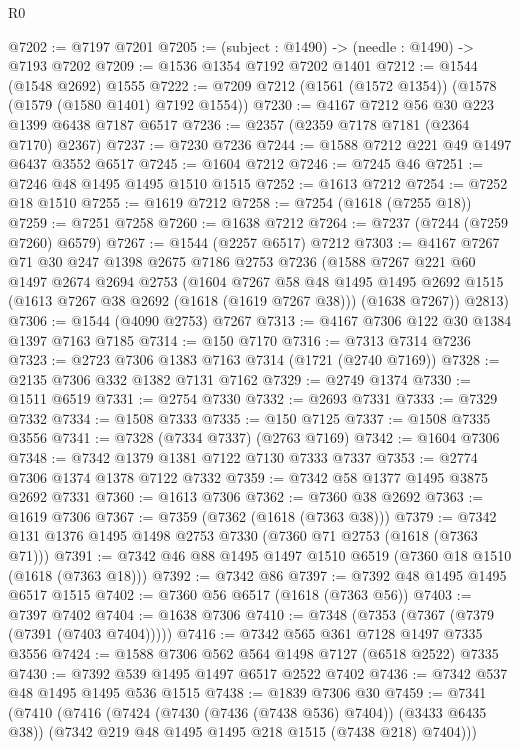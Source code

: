 \begin{lexlean}{R0}
\begin{coremodule}
@7202 := @7197 @7201
@7205 := (subject : @1490) -> (needle : @1490) -> @7193 @7202
@7209 := @1536 @1354 @7192 @7202 @1401
@7212 := @1544 (@1548 @2692) @1555
@7222 := @7209 @7212 (@1561 (@1572 @1354)) (@1578 (@1579 (@1580 @1401) @7192 @1554))
@7230 := @4167 @7212 @56 @30 @223 @1399 @6438 @7187 @6517
@7236 := @2357 (@2359 @7178 @7181 (@2364 @7170) @2367)
@7237 := @7230 @7236
@7244 := @1588 @7212 @221 @49 @1497 @6437 @3552 @6517
@7245 := @1604 @7212
@7246 := @7245 @46
@7251 := @7246 @48 @1495 @1495 @1510 @1515
@7252 := @1613 @7212
@7254 := @7252 @18 @1510
@7255 := @1619 @7212
@7258 := @7254 (@1618 (@7255 @18))
@7259 := @7251 @7258
@7260 := @1638 @7212
@7264 := @7237 (@7244 (@7259 @7260) @6579)
@7267 := @1544 (@2257 @6517) @7212
@7303 := @4167
    @7267
    @71
    @30
    @247
    @1398
    @2675
    @7186
    @2753
    @7236
    (@1588
      @7267
      @221
      @60
      @1497
      @2674
      @2694
      @2753
      (@1604
        @7267
        @58
        @48
        @1495
        @1495
        @2692
        @1515
        (@1613 @7267 @38 @2692 (@1618 (@1619 @7267 @38)))
        (@1638 @7267))
      @2813)
@7306 := @1544 (@4090 @2753) @7267
@7313 := @4167 @7306 @122 @30 @1384 @1397 @7163 @7185
@7314 := @150 @7170
@7316 := @7313 @7314 @7236
@7323 := @2723 @7306 @1383 @7163 @7314 (@1721 (@2740 @7169))
@7328 := @2135 @7306 @332 @1382 @7131 @7162
@7329 := @2749 @1374
@7330 := @1511 @6519
@7331 := @2754 @7330
@7332 := @2693 @7331
@7333 := @7329 @7332
@7334 := @1508 @7333
@7335 := @150 @7125
@7337 := @1508 @7335 @3556
@7341 := @7328 (@7334 @7337) (@2763 @7169)
@7342 := @1604 @7306
@7348 := @7342 @1379 @1381 @7122 @7130 @7333 @7337
@7353 := @2774 @7306 @1374 @1378 @7122 @7332
@7359 := @7342 @58 @1377 @1495 @3875 @2692 @7331
@7360 := @1613 @7306
@7362 := @7360 @38 @2692
@7363 := @1619 @7306
@7367 := @7359 (@7362 (@1618 (@7363 @38)))
@7379 := @7342 @131 @1376 @1495 @1498 @2753 @7330 (@7360 @71 @2753 (@1618 (@7363 @71)))
@7391 := @7342 @46 @88 @1495 @1497 @1510 @6519 (@7360 @18 @1510 (@1618 (@7363 @18)))
@7392 := @7342 @86
@7397 := @7392 @48 @1495 @1495 @6517 @1515
@7402 := @7360 @56 @6517 (@1618 (@7363 @56))
@7403 := @7397 @7402
@7404 := @1638 @7306
@7410 := @7348 (@7353 (@7367 (@7379 (@7391 (@7403 @7404)))))
@7416 := @7342 @565 @361 @7128 @1497 @7335 @3556
@7424 := @1588 @7306 @562 @564 @1498 @7127 (@6518 @2522) @7335
@7430 := @7392 @539 @1495 @1497 @6517 @2522 @7402
@7436 := @7342 @537 @48 @1495 @1495 @536 @1515
@7438 := @1839 @7306 @30
@7459 := @7341
    (@7410
      (@7416
        (@7424 (@7430 (@7436 (@7438 @536) @7404)) (@3433 @6435 @38))
        (@7342 @219 @48 @1495 @1495 @218 @1515 (@7438 @218) @7404)))

\end{coremodule}
\end{lexlean}
